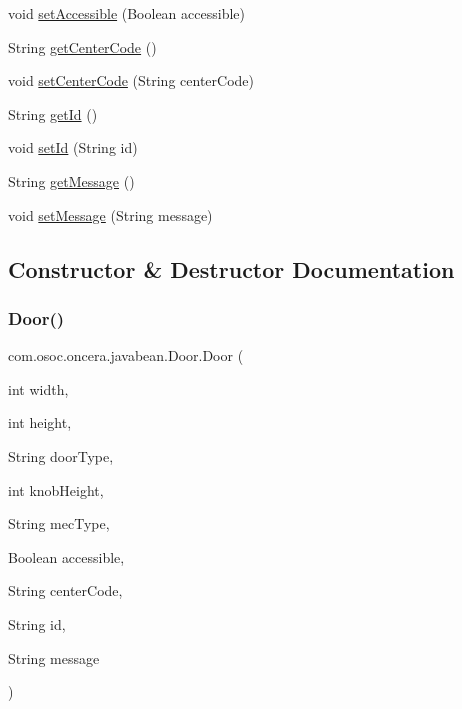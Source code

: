 \begin{DoxyCompactItemize}
\item 
void \mbox{\hyperlink{classcom_1_1osoc_1_1oncera_1_1javabean_1_1_door_a79198d1bbcde2e018ef27a291adc1c8f}{set\+Accessible}} (Boolean accessible)
\item 
String \mbox{\hyperlink{classcom_1_1osoc_1_1oncera_1_1javabean_1_1_door_a1baa47b4a3f9c76a817ddc43d59cd07e}{get\+Center\+Code}} ()
\item 
void \mbox{\hyperlink{classcom_1_1osoc_1_1oncera_1_1javabean_1_1_door_a1ce90420107d8612703df252c44bfc97}{set\+Center\+Code}} (String center\+Code)
\item 
String \mbox{\hyperlink{classcom_1_1osoc_1_1oncera_1_1javabean_1_1_door_a21fcc4c73de59125f39b8b7811cc9a46}{get\+Id}} ()
\item 
void \mbox{\hyperlink{classcom_1_1osoc_1_1oncera_1_1javabean_1_1_door_a2ff2e2d2f3c9465904e4d03f58465837}{set\+Id}} (String id)
\item 
String \mbox{\hyperlink{classcom_1_1osoc_1_1oncera_1_1javabean_1_1_door_a4ab92de81f01762dbea7905cd0c6d3a3}{get\+Message}} ()
\item 
void \mbox{\hyperlink{classcom_1_1osoc_1_1oncera_1_1javabean_1_1_door_a669b8120c9b2d0758ce4240e3a845516}{set\+Message}} (String message)
\end{DoxyCompactItemize}


\subsection{Constructor \& Destructor Documentation}
\mbox{\label{classcom_1_1osoc_1_1oncera_1_1javabean_1_1_door_a67f19cb0ecd6d2d3af0cff87167435e5}} 
\subsubsection{\texorpdfstring{Door()}{Door()}\hspace{0.1cm}{\footnotesize\ttfamily [1/2]}}
{\footnotesize\ttfamily com.\+osoc.\+oncera.\+javabean.\+Door.\+Door (\begin{DoxyParamCaption}\item[{int}]{width,  }\item[{int}]{height,  }\item[{String}]{door\+Type,  }\item[{int}]{knob\+Height,  }\item[{String}]{mec\+Type,  }\item[{Boolean}]{accessible,  }\item[{String}]{center\+Code,  }\item[{String}]{id,  }\item[{String}]{message }\end{DoxyParamCaption})}

